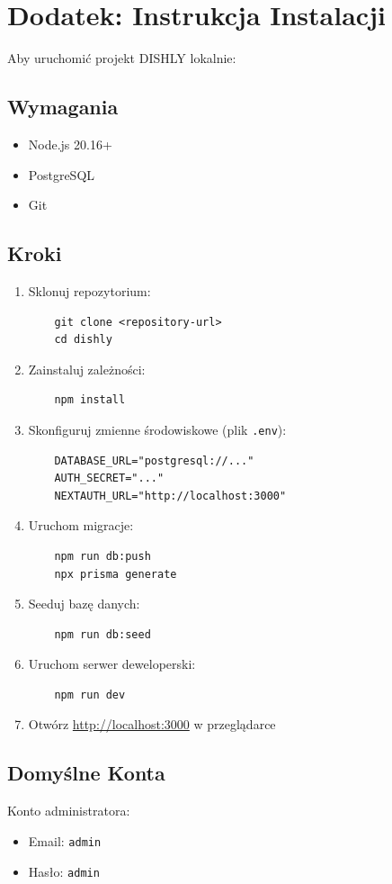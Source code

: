 \documentclass[12pt,a4paper,utf-8]{article}
\begin{document}
\newpage

\section{Dodatek: Instrukcja Instalacji}

Aby uruchomić projekt DISHLY lokalnie:

\subsection{Wymagania}

\begin{itemize}
    \item Node.js 20.16+
    \item PostgreSQL
    \item Git
\end{itemize}

\subsection{Kroki}

\begin{enumerate}
    \item Sklonuj repozytorium:
    \begin{verbatim}
    git clone <repository-url>
    cd dishly
    \end{verbatim}
    
    \item Zainstaluj zależności:
    \begin{verbatim}
    npm install
    \end{verbatim}
    
    \item Skonfiguruj zmienne środowiskowe (plik \texttt{.env}):
    \begin{verbatim}
    DATABASE_URL="postgresql://..."
    AUTH_SECRET="..."
    NEXTAUTH_URL="http://localhost:3000"
    \end{verbatim}
    
    \item Uruchom migracje:
    \begin{verbatim}
    npm run db:push
    npx prisma generate
    \end{verbatim}
    
    \item Seeduj bazę danych:
    \begin{verbatim}
    npm run db:seed
    \end{verbatim}
    
    \item Uruchom serwer deweloperski:
    \begin{verbatim}
    npm run dev
    \end{verbatim}
    
    \item Otwórz \href{http://localhost:3000}{http://localhost:3000} w przeglądarce
\end{enumerate}

\subsection{Domyślne Konta}

Konto administratora:
\begin{itemize}
    \item Email: \texttt{admin}
    \item Hasło: \texttt{admin}
\end{itemize}

\newpage
\end{document}
